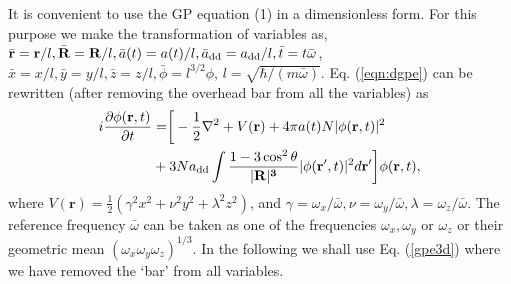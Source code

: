 \documentclass[amsmath,amssymb,article,twocolumn,superscriptaddress,showpacs,10pt]{revtex4-1}
\begin{document}
It is convenient to use the GP equation (1) in a dimensionless form. For this purpose we make the transformation of variables as, ${\bar {\bf r}}= {\bf r}/l,{\bar {\bf R}}={\bf R}/l, \bar a(t)=a(t)/l, \bar a_{\mathrm{dd}}=a_{\mathrm{dd}}/l, \bar t=t\bar \omega$, $\bar x=x/l, \bar y=y/l, \bar z=z/l, \bar \phi=l^{3/2}\phi$, $l=\sqrt{\hbar/(m\bar \omega)}$. Eq. (\ref{eqn:dgpe})  can be rewritten (after removing the overhead bar from all the variables) as 
\begin{align}
\begin{split}
i \frac{\partial \phi({\mathbf{r}},{t})}{\partial t} & = \biggr[-\frac{1}{2}\nabla^2+ V({\mathbf{r}})+4 \pi  a(t) N \vert {\phi({\mathbf{r}},{t})} \vert^2\\
&+3N a_{\mathrm{dd}}\int \frac{1-3\cos^2\theta}{\vert \bf{R}\vert^3} \vert \phi({\mathbf{r}}',t) \vert^2 d{\mathbf{r}}'\biggr] \phi({\mathbf{r}},{t}),\label{gpe3d} 
\end{split}
\end{align}
where  $V({\mathbf{r}})=\frac{1}{2}(\gamma^2 x^2+\nu^2 y^2+\lambda^{2} z^2)$, and  $\gamma= \omega_x/\bar \omega, \nu=\omega_y/\bar \omega,\lambda =\omega_z/\bar \omega$. The reference frequency $\bar \omega $ can be taken as one of the frequencies $\omega_x, \omega_y$ or $\omega_z$ or their geometric mean $(\omega_x \omega_y \omega_z)^{1/3}$. In the following we shall use Eq. (\ref{gpe3d}) where we have  removed the `bar' from all variables. %
\end{document}
